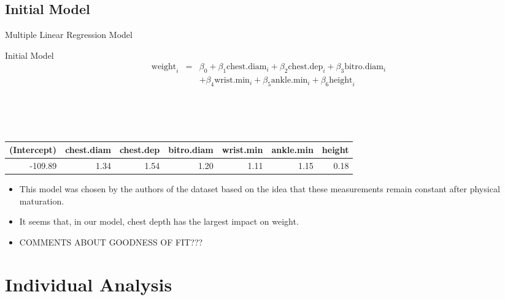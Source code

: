 \documentclass[table]{beamer}\usepackage[]{graphicx}\usepackage[]{color}
\begin{document}

\subsection{Initial Model}


\begin{frame}{Multiple Linear Regression Model}

\begin{block}{Initial Model}
\begin{eqnarray*}
\text{weight}_i &=& \beta_0 + \beta_1 \text{chest.diam}_{i} + \beta_2 \text{chest.dep}_{i} + \beta_3 \text{bitro.diam}_{i} \\
&& + \beta_4 \text{wrist.min}_{i} + \beta_5 \text{ankle.min}_{i} + \beta_6 \text{height}_{i}
\end{eqnarray*}
\end{block}

\\

\\

\\

{\fontsize{0.275cm}{1em}\selectfont 
\begin{tabular}{|r|r|r|r|r|r|r|}
\hline
    (Intercept) & chest.diam & chest.dep & bitro.diam & wrist.min & ankle.min & height \\ \hline
   -109.89 & 1.34  & 1.54 & 1.20  & 1.11 & 1.15 & 0.18 \\ \hline
\end{tabular}

\begin{itemize}
  \item This model was chosen by the authors of the dataset based on the idea that these measurements remain constant after physical maturation.
  \item It seems that, in our model, chest depth has the largest impact on weight.
  \item COMMENTS ABOUT GOODNESS OF FIT???
\end{itemize}

}
\end{frame}



\section{Individual Analysis}
\end{document}
